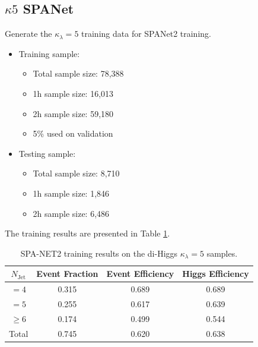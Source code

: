 \documentclass[12pt]{article}
\begin{document}
	\subsection{\texorpdfstring{$\kappa 5$}{kappa 5} SPANet}%
	\label{sub:kappa_5_spanet}
		Generate the $\kappa_\lambda = 5$ training data for SPANet2 training.
		\begin{itemize}
			\item Training sample:
			\begin{itemize}
				\item Total sample size: 78,388
				\item 1h sample size: 16,013
				\item 2h sample size: 59,180
				\item 5\% used on validation
			\end{itemize}
			\item Testing sample: 
			\begin{itemize}
				\item Total sample size: 8,710
				\item 1h sample size: 1,846
				\item 2h sample size: 6,486
			\end{itemize}
		\end{itemize}
		The training results are presented in Table \ref{tab:SPANet2_diHiggs_4btag_DL1r_pt40_k5}.
		\begin{table}[htpb]
			\centering
			\caption{SPA-NET2 training results on the di-Higgs $\kappa_\lambda =5$ samples.}
			\label{tab:SPANet2_diHiggs_4btag_DL1r_pt40_k5}
			\begin{tabular}{c|c|cc}
				$N_\text{Jet}$ & Event Fraction & Event Efficiency & Higgs Efficiency \\
				\hline
				$=4$	  &   0.315             &    0.689              &    0.689             \\
				$=5$	  &   0.255             &    0.617              &    0.639             \\
				$\ge 6$	  &   0.174             &    0.499              &    0.544             \\
				Total	  &   0.745             &    0.620              &    0.638             \\
			\end{tabular}
		\end{table}

\end{document}
